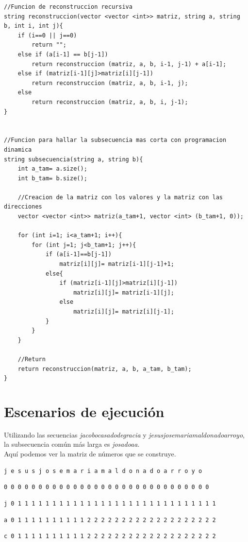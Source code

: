 \documentclass[11pt,a4paper]{article} %
\begin{document}
\begin{lstlisting}[style=C++]
//Funcion de reconstruccion recursiva
string reconstruccion(vector <vector <int>> matriz, string a, string b, int i, int j){
	if (i==0 || j==0)
		return "";
	else if (a[i-1] == b[j-1])
		return reconstruccion (matriz, a, b, i-1, j-1) + a[i-1];
	else if (matriz[i-1][j]>matriz[i][j-1])
		return reconstruccion (matriz, a, b, i-1, j);
	else
		return reconstruccion (matriz, a, b, i, j-1);
}


//Funcion para hallar la subsecuencia mas corta con programacion dinamica
string subsecuencia(string a, string b){
	int a_tam= a.size();
	int b_tam= b.size();
	
	//Creacion de la matriz con los valores y la matriz con las direcciones
	vector <vector <int>> matriz(a_tam+1, vector <int> (b_tam+1, 0));
	
	for (int i=1; i<a_tam+1; i++){
		for (int j=1; j<b_tam+1; j++){
			if (a[i-1]==b[j-1])
				matriz[i][j]= matriz[i-1][j-1]+1;
			else{
				if (matriz[i-1][j]>matriz[i][j-1])
					matriz[i][j]= matriz[i-1][j];
				else
					matriz[i][j]= matriz[i][j-1];
			}
		}
	}	
	
	//Return
	return reconstruccion(matriz, a, b, a_tam, b_tam);
}
\end{lstlisting}

\newpage
\section{Escenarios de ejecución}
Utilizando las secuencias \textit{jacobocasadodegracia} y \textit{jesusjosemariamaldonadoarroyo}, la subsecuencia común más larga es \textit{josadoaa}.\\

Aquí podemos ver la matriz de números que se construye.\\

\small

\hspace{1,72 em} \texttt{j e s u s j o s e m a r i a m a l d o n a d o a r r o y o}

\hspace{0,71 em} \texttt{0 0 0 0 0 0 0 0 0 0 0 0 0 0 0 0 0 0 0 0 0 0 0 0 0 0 0 0 0 0}

\texttt{j 0 1 1 1 1 1 1 1 1 1 1 1 1 1 1 1 1 1 1 1 1 1 1 1 1 1 1 1 1 1}

\texttt{a 0 1 1 1 1 1 1 1 1 1 1 2 2 2 2 2 2 2 2 2 2 2 2 2 2 2 2 2 2 2}

\texttt{c 0 1 1 1 1 1 1 1 1 1 1 2 2 2 2 2 2 2 2 2 2 2 2 2 2 2 2 2 2 2}
\end{document}

